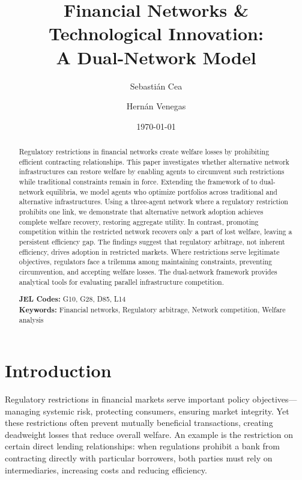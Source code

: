 \documentclass[12pt]{article}
\title{Financial Networks \& Technological Innovation: \\
A Dual-Network Model}
\author{
    Sebastián Cea \and Hernán Venegas
}
\date{\today}
\begin{document}
\maketitle

\begin{abstract}
\noindent Regulatory restrictions in financial networks create welfare losses by prohibiting efficient contracting relationships. This paper investigates whether alternative network infrastructures can restore welfare by enabling agents to circumvent such restrictions while traditional constraints remain in force. Extending the framework of \citet{jalan_incentive-aware_2024} to dual-network equilibria, we model agents who optimize portfolios across traditional and alternative infrastructures. Using a three-agent network where a regulatory restriction prohibits one link, we demonstrate that alternative network adoption achieves complete welfare recovery, restoring aggregate utility. In contrast, promoting competition within the restricted network recovers only a part of lost welfare, leaving a persistent efficiency gap. The findings suggest that regulatory arbitrage, not inherent efficiency, drives adoption in restricted markets. Where restrictions serve legitimate objectives, regulators face a trilemma among maintaining constraints, preventing circumvention, and accepting welfare losses. The dual-network framework provides analytical tools for evaluating parallel infrastructure competition.

\vspace{0.3cm}
\noindent \textbf{JEL Codes:} G10, G28, D85, L14 \\
\noindent \textbf{Keywords:} Financial networks, Regulatory arbitrage, Network competition, Welfare analysis
\end{abstract}

\newpage

\section{Introduction}
\label{sec:introduction}

Regulatory restrictions in financial markets serve important policy objectives---managing systemic risk, protecting consumers, ensuring market integrity. Yet these restrictions often prevent mutually beneficial transactions, creating deadweight losses that reduce overall welfare. An example is the restriction on certain direct lending relationships: when regulations prohibit a bank from contracting directly with particular borrowers, both parties must rely on intermediaries, increasing costs and reducing efficiency.
\end{document}
